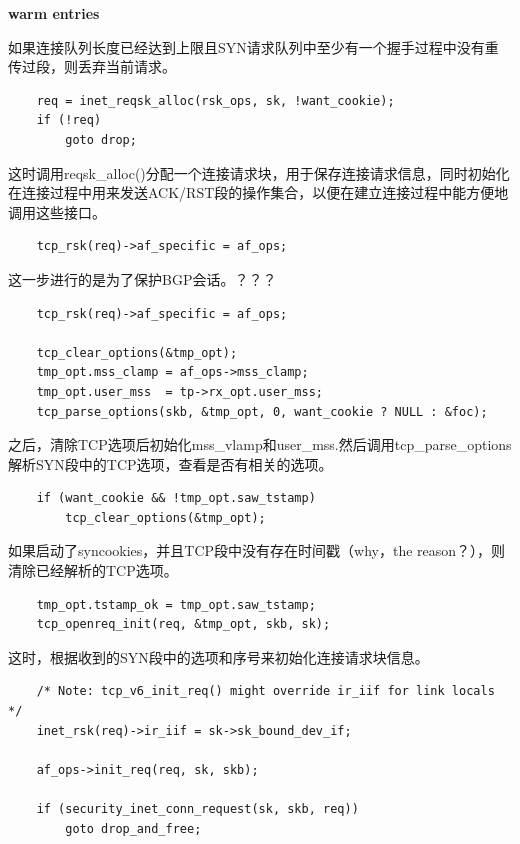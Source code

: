         \textbf{warm entries}               
        
        如果连接队列长度已经达到上限且SYN请求队列中至少有一个握手过程中没有重传过段，则丢弃当前请求。

\begin{verbatim}
    req = inet_reqsk_alloc(rsk_ops, sk, !want_cookie);
    if (!req)
        goto drop;
\end{verbatim}
            
        这时调用reqsk\_alloc()分配一个连接请求块，用于保存连接请求信息，同时初始化在连接过程中用来发送ACK/RST段的操作集合，以便在建立连接过程中能方便地调用这些接口。

\begin{verbatim}
    tcp_rsk(req)->af_specific = af_ops;
\end{verbatim}

        这一步进行的是为了保护BGP会话。？？？
        
\begin{verbatim}
    tcp_rsk(req)->af_specific = af_ops;

    tcp_clear_options(&tmp_opt);
    tmp_opt.mss_clamp = af_ops->mss_clamp;
    tmp_opt.user_mss  = tp->rx_opt.user_mss;
    tcp_parse_options(skb, &tmp_opt, 0, want_cookie ? NULL : &foc);
\end{verbatim}

        之后，清除TCP选项后初始化mss\_vlamp和user\_mss.然后调用tcp\_parse\_options解析SYN段中的TCP选项，查看是否有相关的选项。
\begin{verbatim}
    if (want_cookie && !tmp_opt.saw_tstamp)
        tcp_clear_options(&tmp_opt);
\end{verbatim}

        如果启动了syncookies，并且TCP段中没有存在时间戳（why，the reason？），则清除已经解析的TCP选项。

\begin{verbatim}
    tmp_opt.tstamp_ok = tmp_opt.saw_tstamp;
    tcp_openreq_init(req, &tmp_opt, skb, sk);
\end{verbatim}

        这时，根据收到的SYN段中的选项和序号来初始化连接请求块信息。

\begin{verbatim}
    /* Note: tcp_v6_init_req() might override ir_iif for link locals */
    inet_rsk(req)->ir_iif = sk->sk_bound_dev_if;

    af_ops->init_req(req, sk, skb);

    if (security_inet_conn_request(sk, skb, req))
        goto drop_and_free;
\end{verbatim}

